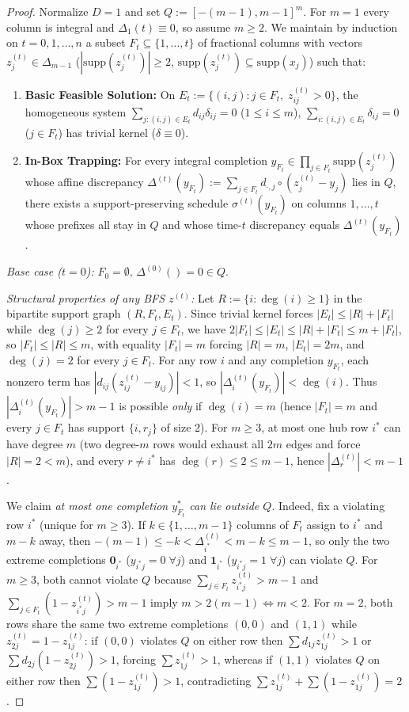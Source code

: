 \documentclass[11pt]{article}
\theoremstyle{definition}
\newcommand{\disc}{\Delta}
\begin{document}
\begin{proof}
Normalize $D=1$ and set $Q:=[-(m-1),m-1]^m$. For $m=1$ every column is integral and $\disc_1(t)\equiv 0$, so assume $m\ge 2$. We maintain by induction on $t=0,1,\dots,n$ a subset $F_t\subseteq\{1,\dots,t\}$ of fractional columns with vectors $z_j^{(t)}\in\Delta_{m-1}$ ($|\mathrm{supp}(z_j^{(t)})|\ge 2$, $\mathrm{supp}(z_j^{(t)})\subseteq\mathrm{supp}(x_j)$) such that:
\begin{enumerate}
\item[(i)] \textbf{Basic Feasible Solution:} On $E_t:=\{(i,j):j\in F_t,\; z_{ij}^{(t)}>0\}$, the homogeneous system $\sum_{j:(i,j)\in E_t} d_{ij}\delta_{ij}=0$ ($1\le i\le m$), $\sum_{i:(i,j)\in E_t}\delta_{ij}=0$ ($j\in F_t$) has trivial kernel ($\delta\equiv 0$).
\item[(ii)] \textbf{In-Box Trapping:} For every integral completion $y_{F_t}\in\prod_{j\in F_t}\mathrm{supp}(z_j^{(t)})$ whose affine discrepancy $\disc^{(t)}(y_{F_t}):=\sum_{j\in F_t} d_{\cdot,j}\circ(z_j^{(t)}-y_j)$ lies in $Q$, there exists a support-preserving schedule $\sigma^{(t)}(y_{F_t})$ on columns $1,\dots,t$ whose prefixes all stay in $Q$ and whose time-$t$ discrepancy equals $\disc^{(t)}(y_{F_t})$.
\end{enumerate}

\emph{Base case ($t=0$):} $F_0=\emptyset$, $\disc^{(0)}()=0\in Q$.

\emph{Structural properties of any BFS $z^{(t)}$:} Let $R:=\{i:\deg(i)\ge 1\}$ in the bipartite support graph $(R,F_t,E_t)$. Since trivial kernel forces $|E_t|\le |R|+|F_t|$ while $\deg(j)\ge 2$ for every $j\in F_t$, we have $2|F_t|\le |E_t|\le |R|+|F_t|\le m+|F_t|$, so $|F_t|\le |R|\le m$, with equality $|F_t|=m$ forcing $|R|=m$, $|E_t|=2m$, and $\deg(j)=2$ for every $j\in F_t$. For any row $i$ and any completion $y_{F_t}$, each nonzero term has $|d_{ij}(z_{ij}^{(t)}-y_{ij})|<1$, so $|\disc_i^{(t)}(y_{F_t})|<\deg(i)$. Thus $|\disc_i^{(t)}(y_{F_t})|>m-1$ is possible \emph{only} if $\deg(i)=m$ (hence $|F_t|=m$ and every $j\in F_t$ has support $\{i,r_j\}$ of size $2$). For $m\ge 3$, at most one hub row $i^*$ can have degree $m$ (two degree-$m$ rows would exhaust all $2m$ edges and force $|R|=2<m$), and every $r\ne i^*$ has $\deg(r)\le 2\le m-1$, hence $|\disc_r^{(t)}|<m-1$.

We claim \emph{at most one completion $y_{F_t}^*$ can lie outside $Q$}. Indeed, fix a violating row $i^*$ (unique for $m\ge 3$). If $k\in\{1,\dots,m-1\}$ columns of $F_t$ assign to $i^*$ and $m-k$ away, then $-(m-1)\le -k<\disc_{i^*}^{(t)}<m-k\le m-1$, so only the two extreme completions $\mathbf{0}_{i^*}$ ($y_{i^*j}=0\;\forall j$) and $\mathbf{1}_{i^*}$ ($y_{i^*j}=1\;\forall j$) can violate $Q$. For $m\ge 3$, both cannot violate $Q$ because $\sum_{j\in F_t} z_{i^*j}^{(t)}>m-1$ and $\sum_{j\in F_t}(1-z_{i^*j}^{(t)})>m-1$ imply $m>2(m-1)\iff m<2$. For $m=2$, both rows share the same two extreme completions $(0,0)$ and $(1,1)$ while $z_{2j}^{(t)}=1-z_{1j}^{(t)}$: if $(0,0)$ violates $Q$ on either row then $\sum d_{1j}z_{1j}^{(t)}>1$ or $\sum d_{2j}(1-z_{2j}^{(t)})>1$, forcing $\sum z_{1j}^{(t)}>1$, whereas if $(1,1)$ violates $Q$ on either row then $\sum(1-z_{1j}^{(t)})>1$, contradicting $\sum z_{1j}^{(t)}+\sum(1-z_{1j}^{(t)})=2$.


\end{proof}
\end{document}
